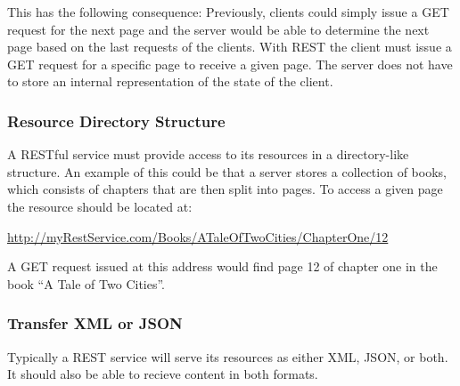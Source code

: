 This has the following consequence: Previously, clients could simply issue a GET request for the next page and the server would be able to determine the next page based on the last requests of the clients. With REST the client must issue a GET request for a specific page to receive a given page. The server does not have to store an internal representation of the state of the client.

\subsubsection{Resource Directory Structure}
A RESTful service must provide access to its resources in a directory-like structure. An example of this could be that a server stores a collection of books, which consists of chapters that are then split into pages. To access a given page the resource should be located at: \newline
\begin{center}
\url{http://myRestService.com/Books/ATaleOfTwoCities/ChapterOne/12}
\end{center}
A GET request issued at this address would find page 12 of chapter one in the book “A Tale of Two Cities”.

\subsubsection{Transfer XML or JSON}
Typically a REST service will serve its resources as either XML, JSON, or both. It should also be able to recieve content in both formats.